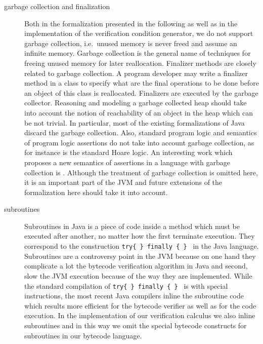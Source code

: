 \begin{description}
   \item [garbage collection and finalization]
         Both in the formalization presented in the following as well as in the implementation of the verification condition 
	 generator, we do not support garbage collection, i.e.\ unused memory is never freed and assume
	  an infinite memory. Garbage collection is the general name of techniques for freeing unused memory 
	 for later reallocation. Finalizer methods are closely related to garbage collection.
	 A program developer may write a finalizer method in a class to specify what are 
	 the final operations to be done before an object of this class is reallocated. Finalizers are executed
	 by the garbage collector. Reasoning and modeling a garbage collected heap should take into account the notion of reachability of an object in 
	 the heap which can be not trivial. In particular, most of the existing formalizations of Java discard the garbage collection. 
	 Also, standard program logic and semantics of program logic assertions do not take into account garbage collection,
	 as for instance is the  standard Hoare logic. An interesting work which proposes a new semantics of assertions in a 
	 language with garbage collection is \cite{CHB03PLE}. Although the treatment of garbage collection is  omitted here,
	 it is an important part of the JVM and future extensions of the formalization here should take it into account.
	     
   \item [subroutines] Subroutines in Java is a piece of code inside a method which must be executed 
         after another, no matter how the first terminate execution. 
	 They correspond to the construction \texttt{try\{ \} finally \{ \} } in the Java language.
	 Subroutines are a controversy point 
	 in the JVM because on one hand they complicate a lot the bytecode verification algorithm in Java and second,
	 slow the JVM execution because of the way they are implemented. While the standard compilation of  \texttt{try\{ \} finally \{ \} }
	 is with special instructions, the most recent Java compilers inline the subroutine 
	 code which results more efficient for the bytecode verifier as well as for the code execution. 
	 In the implementation of our verification calculus we also inline subroutines and in this way we omit the special bytecode constructs
	 for subroutines in our bytecode language. 
	

\end{description}
